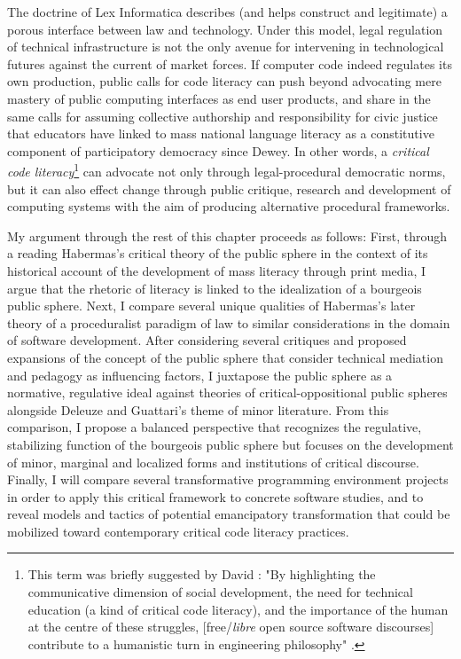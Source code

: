The doctrine of Lex Informatica describes (and helps construct and legitimate) a porous interface between law and technology. Under this model, legal regulation of technical infrastructure is not the only avenue for intervening in technological futures against the current of market forces. If computer code indeed regulates its own production, public calls for code literacy can push beyond advocating mere mastery of public computing interfaces as end user products, and share in the same calls for assuming collective authorship and responsibility for civic justice that educators have linked to mass national language literacy as a constitutive component of participatory democracy since Dewey. In other words, a \emph{critical code literacy}\footnote{
  This term was briefly suggested by David \citeauthor{Berry2008}: "By highlighting the communicative dimension of social development, the need for technical education (a kind of critical code literacy), and the importance of the human at the centre of these struggles, [free/\emph{libre} open source software discourses] contribute to a humanistic turn in engineering philosophy" \autocite[192]{Berry2008}.
}
can advocate not only through legal-procedural democratic norms, but it can also effect change through public critique, research and development of computing systems with the aim of producing alternative procedural frameworks.

My argument through the rest of this chapter proceeds as follows: First, through a reading Habermas's critical theory of the public sphere in the context of its historical account of the development of mass literacy through print media, I argue that the rhetoric of literacy is linked to the idealization of a bourgeois public sphere. Next, I compare several unique qualities of Habermas's later theory of a proceduralist paradigm of law to similar considerations in the domain of software development. After considering several critiques and proposed expansions of the concept of the public sphere that consider technical mediation and pedagogy as influencing factors, I juxtapose the public sphere as a normative, regulative ideal against theories of critical-oppositional public spheres alongside Deleuze and Guattari's theme of minor literature. From this comparison, I propose a balanced perspective that recognizes the regulative, stabilizing function of the bourgeois public sphere but focuses on the development of minor, marginal and localized forms and institutions of critical discourse. Finally, I will compare several transformative programming environment projects in order to apply this critical framework to concrete software studies, and to reveal models and tactics of potential emancipatory transformation that could be mobilized toward contemporary critical code literacy practices.

